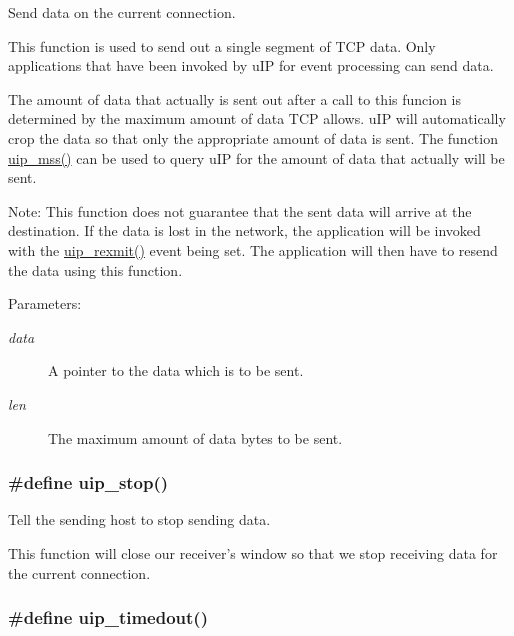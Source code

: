 Send data on the current connection. 

This function is used to send out a single segment of TCP data. Only applications that have been invoked by u\-IP for event processing can send data.

The amount of data that actually is sent out after a call to this funcion is determined by the maximum amount of data TCP allows. u\-IP will automatically crop the data so that only the appropriate amount of data is sent. The function \hyperlink{a00064_gb5fecbc62edd128012cea0f47b57ab9f}{uip\_\-mss()} can be used to query u\-IP for the amount of data that actually will be sent.

\begin{Desc}
\item[Note:]This function does not guarantee that the sent data will arrive at the destination. If the data is lost in the network, the application will be invoked with the \hyperlink{a00064_ga8933ad15a2e2947dae4a5cff50e6007}{uip\_\-rexmit()} event being set. The application will then have to resend the data using this function.\end{Desc}
\begin{Desc}
\item[Parameters:]
\begin{description}
\item[{\em data}]A pointer to the data which is to be sent.\item[{\em len}]The maximum amount of data bytes to be sent. \end{description}
\end{Desc}
\hypertarget{a00064_g0a8bb9d6d0f1f56852ccfccbbad6c5d8}{
\subsubsection[uip\_\-stop]{\setlength{\rightskip}{0pt plus 5cm}\#define uip\_\-stop()}}
\label{a00064_g0a8bb9d6d0f1f56852ccfccbbad6c5d8}


Tell the sending host to stop sending data. 

This function will close our receiver's window so that we stop receiving data for the current connection. \hypertarget{a00064_g7b2ac4b18bd2ac3912fe67b3b17158c3}{
\subsubsection[uip\_\-timedout]{\setlength{\rightskip}{0pt plus 5cm}\#define uip\_\-timedout()}}
\label{a00064_g7b2ac4b18bd2ac3912fe67b3b17158c3}



